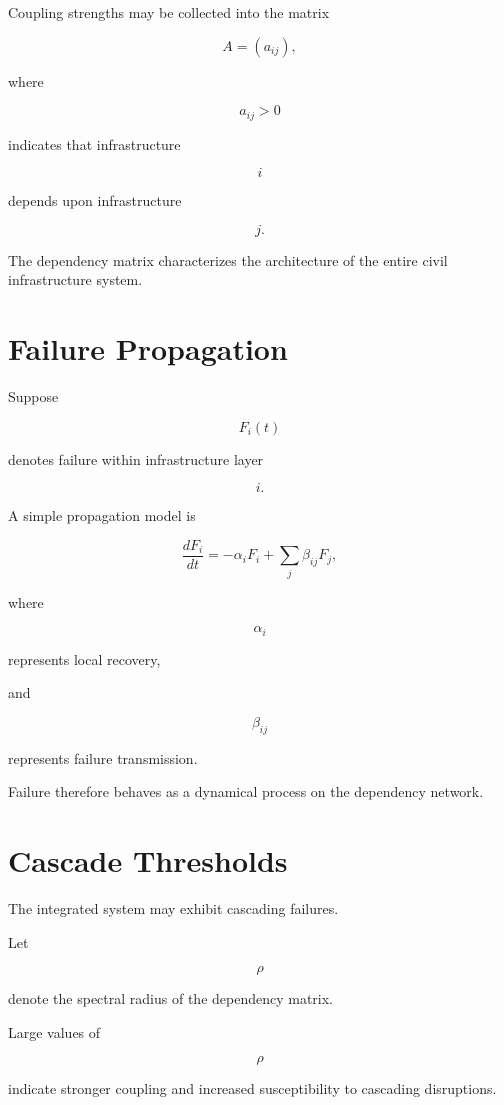 \documentclass[11pt,fleqn]{book}
\numberwithin{equation}{chapter}
\theoremstyle{plain}
\theoremstyle{definition}
\theoremstyle{remark}
\begin{document}
Coupling strengths may be collected into the matrix

\[
\boxed{
A
=
(a_{ij}),
}
\]

where

\[
a_{ij}>0
\]

indicates that infrastructure

\[
i
\]

depends upon infrastructure

\[
j.
\]

The dependency matrix characterizes the architecture of the entire
civil infrastructure system.


\section{Failure Propagation}

Suppose

\[
F_i(t)
\]

denotes failure within infrastructure layer

\[
i.
\]

A simple propagation model is

\[
\boxed{
\frac{dF_i}{dt}
=
-\alpha_iF_i
+
\sum_j
\beta_{ij}F_j,
}
\]

where

\[
\alpha_i
\]

represents local recovery,

and

\[
\beta_{ij}
\]

represents failure transmission.

Failure therefore behaves as a dynamical process on the dependency
network.


\section{Cascade Thresholds}

The integrated system may exhibit cascading failures.

Let

\[
\rho
\]

denote the spectral radius of the dependency matrix.

Large values of

\[
\rho
\]

indicate stronger coupling and increased susceptibility to cascading
disruptions.
\end{document}
